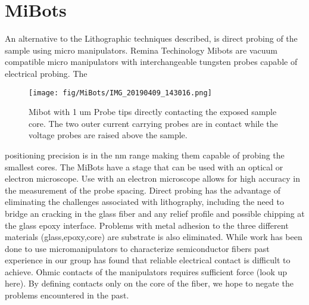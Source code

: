 
\chapter{MiBots}
An alternative to the Lithographic techniques described, is direct probing of the sample using micro manipulators. Remina Techinology Mibots are vacuum compatible micro manipulators with interchangeable tungsten probes capable of electrical probing. The \begin{wrapfigure}{r}{.5\textwidth}
\texttt{[image: fig/MiBots/IMG\_20190409\_143016.png]}
\caption{Mibot with 1 um Probe tips directly contacting the exposed sample core. The two outer current carrying probes are in contact while the voltage probes are raised above the sample.}
\end{wrapfigure} positioning precision is in the nm range making them capable of probing the smallest cores. The MiBots have a stage that can be used with an optical or electron microscope. Use with an electron microscope allows for high accuracy in the measurement of the probe spacing. Direct probing has the advantage of eliminating the challenges associated with lithography, including the need to bridge an cracking in the glass fiber and any relief profile and possible chipping at the glass epoxy interface. Problems with metal adhesion to the three different materials (glass,epoxy,core) are substrate is also eliminated. While work has been done to use micromanipulators to characterize semiconductor fibers \cite{Engel2016DirectPhotosynthesis} 
past experience in our group has found that reliable electrical contact is difficult to achieve. Ohmic contacts of the manipulators requires sufficient force (look up here). By defining contacts only on the core of the fiber, we hope to negate the problems encountered in the past. 


\cleardoublepage
